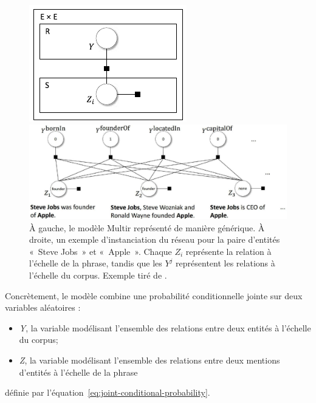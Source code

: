 \documentclass[12pt,a4paper,times,twoside,openright]{report}
\begin{document}
\begin{figure}[ht!]
    \begin{minipage}{0.25\linewidth}
        \centering
        \includegraphics[scale=1.0]{images/multir/model}
    \end{minipage}
    \begin{minipage}{0.74\linewidth}
        \centering
        \includegraphics[scale=0.50]{images/multir/variableDependencies}
    \end{minipage}
\caption{À gauche, le modèle Multir représenté de manière générique. À droite, un exemple d'instanciation du réseau pour la paire d'entités «\ Steve Jobs\ » et «\ Apple\ ». Chaque $Z_{i}$ représente la relation à l'échelle de la phrase, tandis que les $Y^{j}$ représentent les relations à l'échelle du corpus. Exemple tiré de \citet{hoffmann2011knowledge}.}
\label{fig:YZDependencies}
\end{figure}

Concrètement, le modèle combine une probabilité conditionnelle jointe sur deux variables aléatoires :
\begin{itemize}
\item \emph{Y}, la variable modélisant l'ensemble des relations entre deux entités à l'échelle du corpus;
\item \emph{Z}, la variable modélisant l'ensemble des relations entre deux mentions d'entités à l'échelle de la phrase
\end{itemize}
définie par l'équation\ \ref{eq:joint-conditional-probability}.
\end{document}
